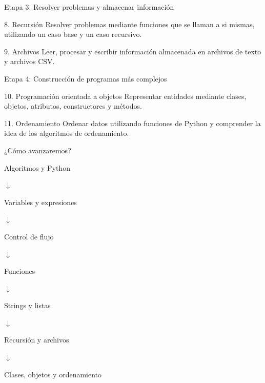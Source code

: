 \documentclass{beamer}
\begin{document}
    \begin{frame}{Etapa 3: Resolver problemas y almacenar información}

        \begin{block}{8. Recursión}
        Resolver problemas mediante funciones que se llaman a si mismas,
        utilizando un caso base y un caso recursivo.
        \end{block}
        
        \begin{block}{9. Archivos}
        Leer, procesar y escribir información almacenada en archivos
        de texto y archivos CSV.
        \end{block}
        
    \end{frame}

    \begin{frame}{Etapa 4: Construcción de programas más complejos}

        \begin{block}{10. Programación orientada a objetos}
        Representar entidades mediante clases, objetos, atributos,
        constructores y métodos.
        \end{block}
        
        \begin{block}{11. Ordenamiento}
        Ordenar datos utilizando funciones de Python y comprender
        la idea de los algoritmos de ordenamiento.
        \end{block}
        
    \end{frame}

    \begin{frame}{¿Cómo avanzaremos?}

        \centering
        
        Algoritmos y Python
        
        $\downarrow$
        
        Variables y expresiones
        
        $\downarrow$
        
        Control de flujo
        
        $\downarrow$
        
        Funciones
        
        $\downarrow$
        
        Strings y listas
        
        $\downarrow$
        
        Recursión y archivos
        
        $\downarrow$
        
        Clases, objetos y ordenamiento
        
    \end{frame}
\end{document}
